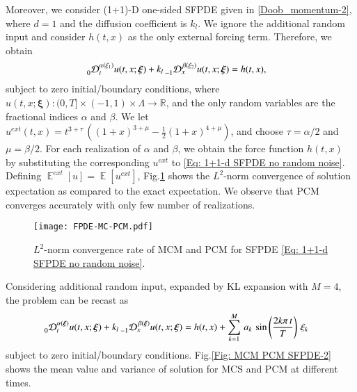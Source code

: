 Moreover, we consider (1+1)-D one-sided SFPDE given in \eqref{Doob_momentum-2}, where $d=1$ and the diffusion coefficient is $k_l$. We ignore the additional random input and consider $h(t,x)$ as the only external forcing term. Therefore, we obtain
%
\begin{align}
\label{Eq: 1+1-d SFPDE no random noise}
%
&\prescript{}{0}{\mathcal{D}}_{t}^{\alpha(\xi_1)}  u(t,x;\boldsymbol{\xi}) 
+ k_l \prescript{}{-1}{\mathcal{D}}_{x}^{\, \beta(\xi_2)} u(t,x;\boldsymbol{\xi}) 
= h(t,x),
%
\end{align}
%
subject to zero initial/boundary conditions, where $u(t,x;\boldsymbol{\xi}): (0,T] \times (-1,1) \times \Lambda \rightarrow \mathbb{R}$, and the only random variables are the fractional indices $\alpha$ and $\beta$. We let $u^{ext}(t,x) = t^{3+\tau} \, \left((1+x)^{3+\mu}-\frac{1}{2}(1+x)^{4+\mu}\right)$, and choose $\tau = \alpha/2$ and $\mu = \beta/2 $. For each realization of $\alpha$ and $\beta$, we obtain the force function $h(t,x)$ by substituting the corresponding $u^{ext}$ to \eqref{Eq: 1+1-d SFPDE no random noise}. Defining $\mathop{\mathbb{E}}^{ext}[u] = \mathop{\mathbb{E}}[u^{ext}]$, Fig.\ref{Fig: MCM PCM SDPDE no noise} shows the $L^2$-norm convergence of solution expectation as compared to the exact expectation. We observe that PCM converges accurately with only few number of realizations.
%
%
\begin{figure}[t]
	\centering
	\texttt{[image: FPDE-MC-PCM.pdf]}
	\caption{$L^2$-norm convergence rate of MCM and PCM for SFPDE \eqref{Eq: 1+1-d SFPDE no random noise}.}
	\label{Fig: MCM PCM SDPDE no noise}
\end{figure}
%
%

Considering additional random input, expanded by KL expansion with $M=4$, the problem can be recast as
%
\begin{align}
\label{1+1-d SFPDE with random noise}
%
&\prescript{}{0}{\mathcal{D}}_{t}^{\alpha(\boldsymbol{\xi})}  u(t,x;\boldsymbol{\xi}) 
+ k_l \prescript{}{-1}{\mathcal{D}}_{x}^{\, \beta(\boldsymbol{\xi})} u(t,x;\boldsymbol{\xi}) 
= h(t,x) +   \sum_{k=1}^M \, a_k \, \sin\left(\frac{2 k \pi \, t}{T}\right) \, \xi_k 
%
\end{align}
%
subject to zero initial/boundary conditions. Fig.\ref{Fig: MCM PCM SFPDE-2} shows the mean value and variance of solution for MCS and PCM at different times.

